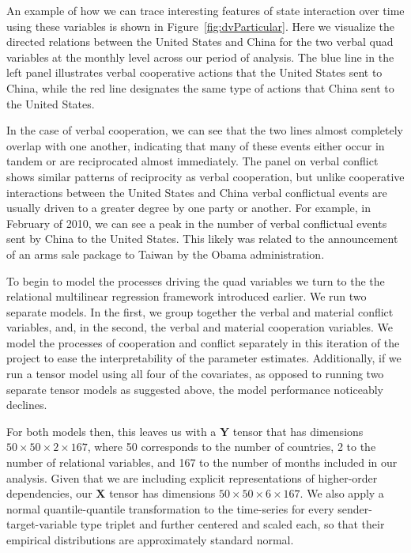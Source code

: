 \documentclass[3p,times,twocolumn,authoryear,12pt]{elsarticle}
\newcommand{\bl}[1]{{\mathbf #1}}
\begin{document}
An example of how we can trace interesting features of state interaction over time using these variables is shown in Figure~\ref{fig:dvParticular}. Here we visualize the directed relations between the United States and China for the two verbal quad variables at the monthly level across our period of analysis. The blue line in the left panel illustrates verbal cooperative actions that the United States sent to China, while the red line designates the same type of actions that China sent to the United States. 

In the case of verbal cooperation, we can see that the two lines almost completely overlap with one another, indicating that many of these events either occur in tandem or are reciprocated almost immediately. The panel on verbal conflict shows similar patterns of reciprocity as verbal cooperation, but unlike cooperative interactions between the United States and China verbal conflictual events are usually driven to a greater degree by one party or another. For example, in February of 2010, we can see a peak in the number of verbal conflictual events sent by China to the United States. This likely was related to the announcement of an arms sale package to Taiwan by the Obama administration. 

To begin to model the processes driving the quad variables we turn to the the relational multilinear regression framework introduced earlier. We run two separate models. In the first, we group together the verbal and material conflict variables, and, in the second, the verbal and material cooperation variables. We model the processes of cooperation and conflict separately in this iteration of the project to ease the interpretability of the parameter estimates. Additionally, if we run a tensor model using all four of the covariates, as opposed to running two separate tensor models as suggested above, the model performance noticeably declines. 

For both models then, this leaves us with a $\bl Y$ tensor that has dimensions $50 \times 50 \times 2 \times 167$, where 50 corresponds to the number of countries, 2 to the number of relational variables, and 167 to the number of months included in our analysis. Given that we are including explicit representations of higher-order dependencies, our $\bl X$ tensor has dimensions $50 \times 50 \times 6 \times 167$. We also apply a normal quantile-quantile transformation to the time-series for every sender-target-variable type triplet and further centered and scaled each, so that their empirical distributions are approximately standard normal. 
\end{document}
